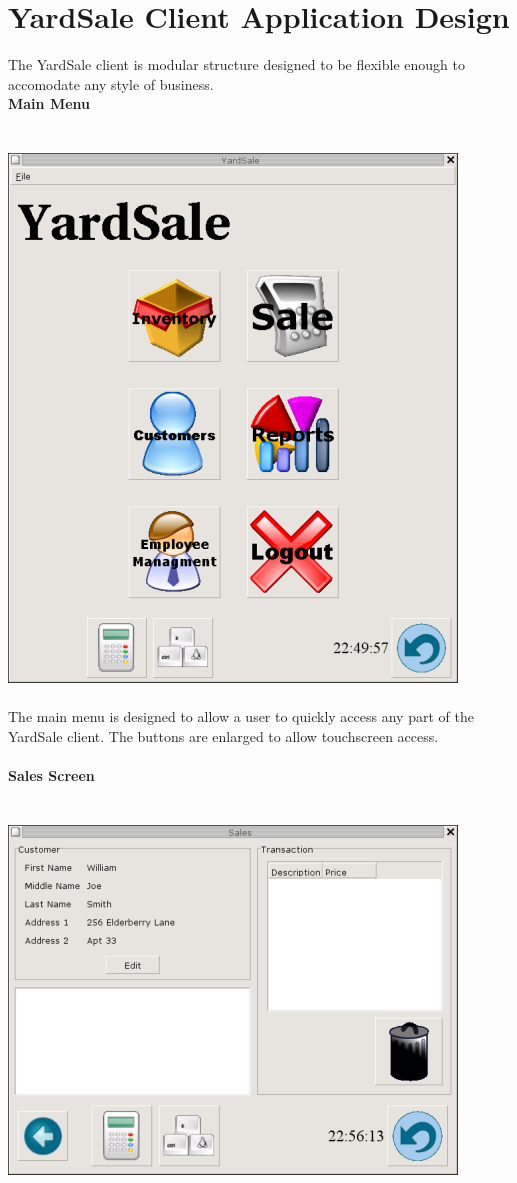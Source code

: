 \documentclass{report}
\begin{document}
	\section{YardSale Client Application Design}
The YardSale client is modular structure designed to be flexible enough to accomodate any style of business.\\
{\bf Main Menu}\\
\\
\\
\includegraphics{ys_main_screener.png}\\
\\
The main menu is designed to allow a user to quickly access any part of the YardSale client.  The buttons are
enlarged to allow touchscreen access.\\
\\
{\bf Sales Screen}\\
\\
\\
\includegraphics{ys_sales_screener.png}\\
\end{document}
